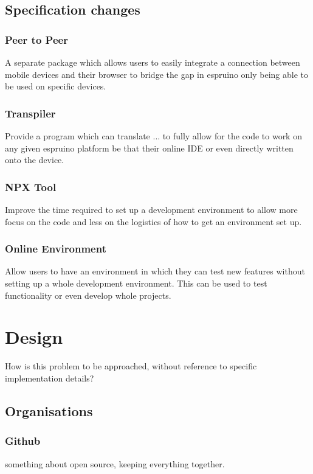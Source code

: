 \documentclass{l4proj}
\begin{document}
\section{Specification changes}
\subsection{Peer to Peer}
\text A separate package which allows users to easily integrate a connection between mobile devices and their browser to bridge the gap in espruino only being able to be used on specific devices.

\subsection{Transpiler}
\text Provide a program which can translate ... to fully allow for the code to work on any given espruino platform be that their online IDE or even directly written onto the device.

\subsection{NPX Tool}
\text Improve the time required to set up a development environment to allow more focus on the code and less on the logistics of how to get an environment set up.

\subsection{Online Environment}
\text Allow users to have an environment in which they can test new features without setting up a whole development environment. This can be used to test functionality or even develop whole projects.
\chapter{Design}
How is this problem to be approached, without reference to specific implementation details? 
\section{Organisations}
\subsection{Github}
\text something about open source, keeping everything together.
\end{document}
